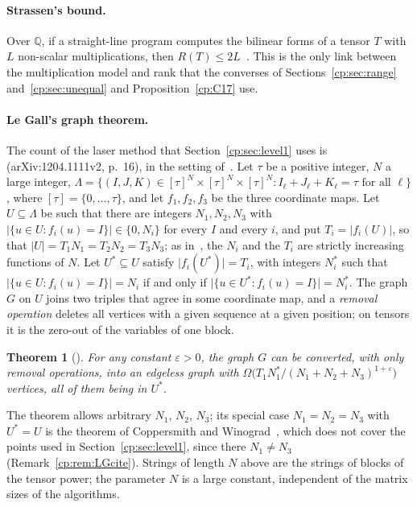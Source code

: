\documentclass[11pt]{article}
\newtheorem{theorem}{Theorem}[section]
\theoremstyle{definition}
\theoremstyle{remark}
\providecommand{\eps}{\varepsilon}
\providecommand{\Q}{\mathbb{Q}}
\newcommand{\abs}[1]{\lvert #1\rvert}
\begin{document}
\paragraph{Strassen's bound.} %
Over $\Q$, if a straight-line program computes the bilinear forms of a tensor $T$ with $L$ non-scalar multiplications, then $R(T)\le2L$~\cite{Str73}. This is the only link between the multiplication model and rank that the converses of Sections~\ref{cp:sec:range} and~\ref{cp:sec:unequal} and Proposition~\ref{cp:C17} use.

\paragraph{Le Gall's graph theorem.} %
The count of the laser method that Section~\ref{cp:sec:level1} uses is~\cite[Theorem~4.2]{LG12} (arXiv:1204.1111v2, p.~16), in the setting of~\cite[Section~4.1]{LG12}. Let $\tau$ be a positive integer, $N$ a large integer, $\Lambda=\{(I,J,K)\in[\tau]^N\times[\tau]^N\times[\tau]^N: I_\ell+J_\ell+K_\ell=\tau\text{ for all }\ell\}$, where $[\tau]=\{0,\dots,\tau\}$, and let $f_1,f_2,f_3$ be the three coordinate maps. Let $U\subseteq\Lambda$ be such that there are integers $N_1,N_2,N_3$ with $\abs{\{u\in U:f_i(u)=I\}}\in\{0,N_i\}$ for every $I$ and every $i$, and put $T_i=\abs{f_i(U)}$, so that $\abs U=T_1N_1=T_2N_2=T_3N_3$; as in~\cite[Section~4.1]{LG12}, the $N_i$ and the $T_i$ are strictly increasing functions of $N$. Let $U^*\subseteq U$ satisfy $\abs{f_i(U^*)}=T_i$, with integers $N_i^*$ such that $\abs{\{u\in U:f_i(u)=I\}}=N_i$ if and only if $\abs{\{u\in U^*:f_i(u)=I\}}=N_i^*$. The graph $G$ on $U$ joins two triples that agree in some coordinate map, and a \emph{removal operation} deletes all vertices with a given sequence at a given position; on tensors it is the zero-out of the variables of one block.

\begin{theorem}[{\cite[Theorem~4.2]{LG12}}]\label{cp:P6:LG}
For any constant $\eps>0$, the graph $G$ can be converted, with only removal operations, into an edgeless graph with $\Omega\bigl(T_1N_1^*/(N_1+N_2+N_3)^{1+\eps}\bigr)$ vertices, all of them being in $U^*$.
\end{theorem}

The theorem allows arbitrary $N_1$, $N_2$, $N_3$; its special case $N_1=N_2=N_3$ with $U^*=U$ is the theorem of Coppersmith and Winograd~\cite[Theorem~4.1]{LG12}, which does not cover the points used in Section~\ref{cp:sec:level1}, since there $N_1\ne N_3$ (Remark~\ref{cp:rem:LGcite}). Strings of length $N$ above are the strings of blocks of the tensor power; the parameter $N$ is a large constant, independent of the matrix sizes of the algorithms.
\end{document}
